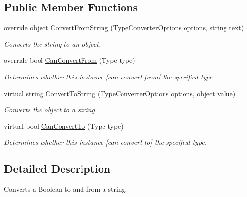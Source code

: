 \subsection*{Public Member Functions}
\begin{DoxyCompactItemize}
\item 
override object \hyperlink{a00023_abc77c631974272fd1dfe3fe4fcc3bf28}{Convert\-From\-String} (\hyperlink{a00152}{Type\-Converter\-Options} options, string text)
\begin{DoxyCompactList}\small\item\em Converts the string to an object. \end{DoxyCompactList}\item 
override bool \hyperlink{a00023_a0be20573af4ee53409bb437125a64268}{Can\-Convert\-From} (Type type)
\begin{DoxyCompactList}\small\item\em Determines whether this instance \mbox{[}can convert from\mbox{]} the specified type. \end{DoxyCompactList}\item 
virtual string \hyperlink{a00066_a36cb2f9b24f15a671293f3a722324c27}{Convert\-To\-String} (\hyperlink{a00152}{Type\-Converter\-Options} options, object value)
\begin{DoxyCompactList}\small\item\em Converts the object to a string. \end{DoxyCompactList}\item 
virtual bool \hyperlink{a00066_acb65bd8c8199d88d5b1629ae35d18514}{Can\-Convert\-To} (Type type)
\begin{DoxyCompactList}\small\item\em Determines whether this instance \mbox{[}can convert to\mbox{]} the specified type. \end{DoxyCompactList}\end{DoxyCompactItemize}


\subsection{Detailed Description}
Converts a Boolean to and from a string. 



